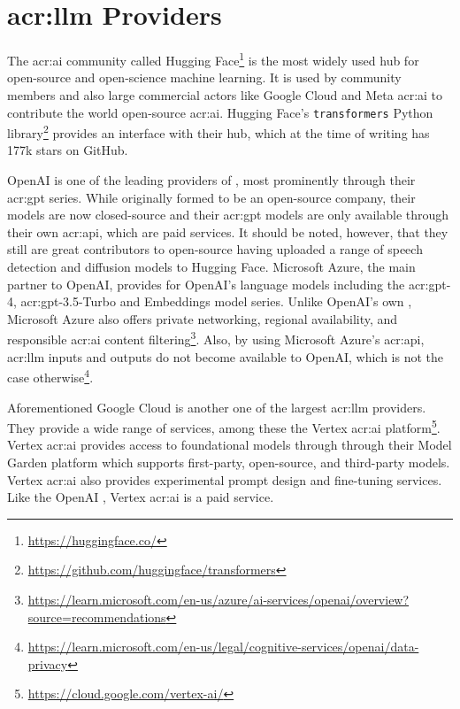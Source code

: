 \section[LLM providers]{\acrlong{acr:llm} Providers}\label{sec:llm-providers}

The \acrshort{acr:ai} community called Hugging Face\footnote{\url{https://huggingface.co/}} is the most widely used hub for open-source and open-science machine learning. It is used by community members and also large commercial actors like Google Cloud and Meta \acrshort{acr:ai} to contribute the world open-source \acrshort{acr:ai}. Hugging Face's \texttt{transformers} Python library\footnote{\url{https://github.com/huggingface/transformers}} provides an interface with their hub, which at the time of writing has 177k stars on GitHub.

OpenAI is one of the leading providers of , most prominently through their \acrshort{acr:gpt} series. While originally formed to be an open-source company, their models are now closed-source and their \acrshort{acr:gpt} models are only available through their own \acrshort{acr:api}, which are paid services. It should be noted, however, that they still are great contributors to open-source having uploaded a range of speech detection and diffusion models to Hugging Face. Microsoft Azure, the main partner to OpenAI, provides  for OpenAI's language models including the \acrshort{acr:gpt}-4, \acrshort{acr:gpt}-3.5-Turbo and Embeddings model series. Unlike OpenAI's own , Microsoft Azure also offers private networking, regional availability, and responsible \acrshort{acr:ai} content filtering\footnote{\url{https://learn.microsoft.com/en-us/azure/ai-services/openai/overview?source=recommendations}}. Also, by using Microsoft Azure's \acrshort{acr:api}, \acrshort{acr:llm} inputs and outputs do not become available to OpenAI, which is not the case otherwise\footnote{\url{https://learn.microsoft.com/en-us/legal/cognitive-services/openai/data-privacy}}.

Aforementioned Google Cloud is another one of the largest \acrshort{acr:llm} providers. They provide a wide range of services, among these the Vertex \acrshort{acr:ai} platform\footnote{\url{https://cloud.google.com/vertex-ai/}}. Vertex \acrshort{acr:ai} provides access to foundational models through  through their Model Garden platform which supports first-party, open-source, and third-party models. Vertex \acrshort{acr:ai} also provides experimental prompt design and fine-tuning services. Like the OpenAI , Vertex \acrshort{acr:ai} is a paid service.

